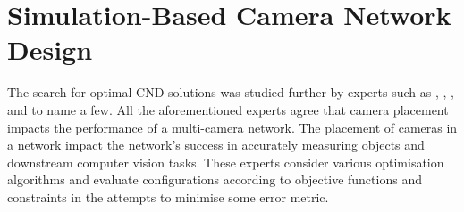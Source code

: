 \section{Simulation-Based Camera Network Design}
\label{sec:relatedwork}
The search for optimal CND solutions was studied further by experts such as \citet{olague2002optimal}, \citet{gonzalez2009optimal}, \citet{zhao2013approximate}, \citet{rahimian2016optimal} and \citet{jorgensen2018simulation} to name a few. All the aforementioned experts agree that camera placement impacts the performance of a multi-camera network. The placement of cameras in a network impact the network's success in accurately measuring objects and downstream computer vision tasks.
These experts consider various optimisation algorithms and evaluate configurations according to objective functions and constraints in the attempts to minimise some error metric.

